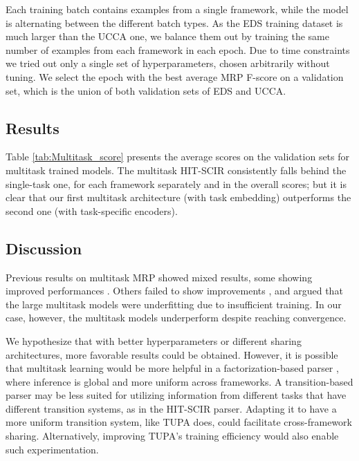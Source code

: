\documentclass[11pt,a4paper]{article}
\begin{document}
Each training batch contains examples from a single framework, while the model is alternating between the different batch types. As the EDS training dataset is much larger than the UCCA one, we balance them out by training the same number of examples from each framework in each epoch.
Due to time constraints we tried out only a single set of hyperparameters, chosen arbitrarily without tuning.
We select the epoch with the best average MRP F-score on a validation set, which is the union of both validation sets of EDS and UCCA.

\subsection{Results}\label{sec:multitask-results}
Table \ref{tab:Multitask_score} presents the average scores on the validation sets for multitask trained models. The multitask HIT-SCIR consistently falls behind the single-task one, for each framework separately and in the overall scores;
but it is clear that our first multitask architecture (with task embedding) outperforms the second one (with task-specific encoders). 

\subsection{Discussion}\label{sec:multitask-discussion}
Previous results on multitask MRP showed mixed results, some showing improved performances \cite{peng-etal-2017-deep,Her:Abe:Rap:18,lindemann-etal-2019-compositional}. Others failed to show improvements \cite{hershcovich-arviv-2019-tupa}, and argued that the large multitask models were underfitting due to insufficient training. In our case, however, the multitask models underperform despite reaching convergence.

We hypothesize that with better hyperparameters or different sharing architectures, more favorable results could be obtained.
However, it is possible that multitask learning would be more helpful in a factorization-based parser \cite{peng-etal-2017-deep,lindemann-etal-2019-compositional}, where inference is global and more uniform across frameworks.
A transition-based parser may be less suited for utilizing information from different tasks that have different transition systems, as in the HIT-SCIR parser. Adapting it to have a more uniform transition system, like TUPA does, could facilitate cross-framework sharing. Alternatively, improving TUPA's training efficiency would also enable such experimentation.
\end{document}
